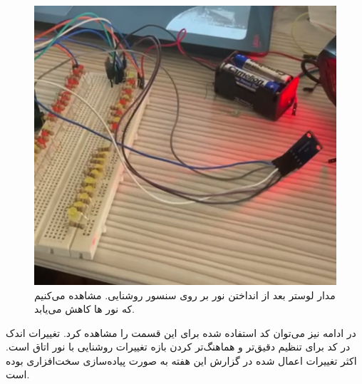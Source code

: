 \documentclass[12pt,a4paper]{article}
\begin{document}
 \begin{figure}[H]
	\centering
	\includegraphics[scale=0.57]{figs/off.png}
	\caption{
		مدار لوستر بعد از انداختن نور بر روی سنسور روشنایی. مشاهده می‌کنیم که نور  ها کاهش می‌یابد.
	}
	\label{fig:schema2}
\end{figure}

در ادامه نیز می‌توان کد استفاده شده برای این قسمت را مشاهده کرد. تغییرات اندک در کد برای تنظیم دقیق‌تر و هماهنگ‌تر کردن بازه تغییرات روشنایی با نور اتاق است. اکثر تغییرات اعمال شده در گزارش این هفته به صورت پیاده‌سازی سخت‌افزاری بوده‌ است.
\begin{latin}
	
\end{latin}
\end{document}
